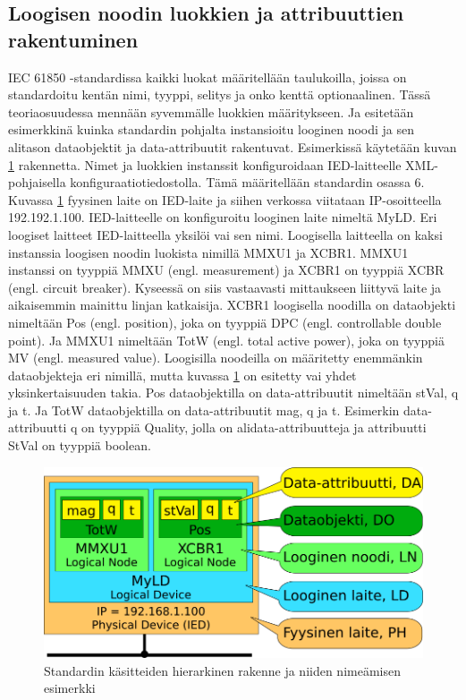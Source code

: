 \subsection{Loogisen noodin luokkien ja attribuuttien rakentuminen}
IEC 61850 -standardissa kaikki luokat määritellään taulukoilla, joissa on standardoitu kentän nimi, tyyppi, selitys ja onko kenttä optionaalinen. Tässä teoriaosuudessa mennään syvemmälle luokkien määritykseen. Ja esitetään esimerkkinä kuinka standardin pohjalta instansioitu looginen noodi ja sen alitason dataobjektit ja data-attribuutit rakentuvat. Esimerkissä käytetään kuvan \ref{fig:iec61850-data-modeling} rakennetta. Nimet ja luokkien instanssit konfiguroidaan IED-laitteelle XML-pohjaisella konfiguraatiotiedostolla. Tämä määritellään standardin osassa 6. Kuvassa \ref{fig:iec61850-data-modeling} fyysinen laite on IED-laite ja siihen verkossa viitataan IP-osoitteella 192.192.1.100. IED-laitteelle on konfiguroitu looginen laite nimeltä MyLD. Eri loogiset laitteet IED-laitteella yksilöi vai sen nimi. Loogisella laitteella on kaksi instanssia loogisen noodin luokista nimillä MMXU1 ja XCBR1. MMXU1 instanssi on tyyppiä MMXU (engl. measurement) \cite[s.~57--58]{IEC61850-7-4} ja XCBR1 on tyyppiä XCBR (engl. circuit breaker). Kyseessä on siis vastaavasti mittaukseen liittyvä laite ja aikaisemmin mainittu linjan katkaisija. XCBR1 loogisella noodilla on dataobjekti nimeltään Pos (engl. position), joka on tyyppiä DPC (engl. controllable double point). Ja MMXU1 nimeltään TotW (engl. total active power), joka on tyyppiä MV (engl. measured value). Loogisilla noodeilla on määritetty enemmänkin dataobjekteja eri nimillä, mutta kuvassa \ref{fig:iec61850-data-modeling} on esitetty vai yhdet yksinkertaisuuden takia. Pos dataobjektilla on data-attribuutit nimeltään stVal, q ja t. Ja TotW dataobjektilla on data-attribuutit mag, q ja t. Esimerkin data-attribuutti q on tyyppiä Quality, jolla on alidata-attribuutteja ja attribuutti StVal on tyyppiä boolean.

\begin{figure}[ht!]
	\includegraphics[width=1\textwidth]{pictures/iec61850-data-modeling.png}
	\caption{Standardin käsitteiden hierarkinen rakenne ja niiden nimeämisen esimerkki}
	\label{fig:iec61850-data-modeling}
\end{figure}

